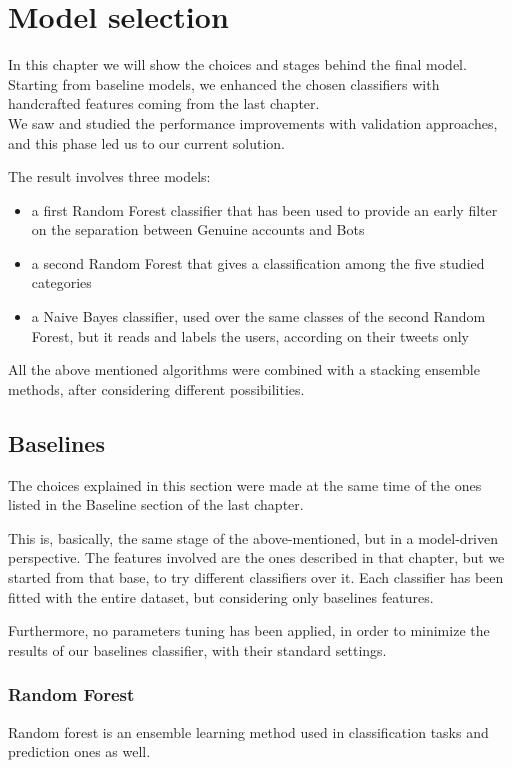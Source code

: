 \chapter{Model selection}
\label{capitolo5}
\thispagestyle{empty}

In this chapter we will show the choices and stages behind the final model.
Starting from baseline models, we enhanced the chosen classifiers with handcrafted features coming from the last chapter.\\
We saw and studied the performance improvements with validation approaches, and this phase led us to our current solution.

The result involves three models:
\begin{itemize}
	\item[\PencilRight] a first Random Forest classifier that has been used to provide an early filter on the separation between Genuine accounts and Bots
	\item[\PencilRight] a second Random Forest that gives a classification among the five studied categories
	\item[\PencilRight] a Naive Bayes classifier, used over the same classes of the second Random Forest, but it reads and labels the users, according on their tweets only
\end{itemize}
All the above mentioned algorithms were combined with a stacking ensemble methods, after considering different possibilities.

\section{Baselines}
The choices explained in this section were made at the same time of the ones listed in the Baseline section of the last chapter.

This is, basically, the same stage of the above-mentioned, but in a model-driven perspective.
The features involved are the ones described in that chapter, but we started from that base, to try different classifiers over it.
Each classifier has been fitted with the entire dataset, but considering only baselines features.

Furthermore, no parameters tuning has been applied, in order to minimize the results of our baselines classifier, with their standard settings.
\subsection{Random Forest}
Random forest is an ensemble learning method used in classification tasks and prediction ones as well.

